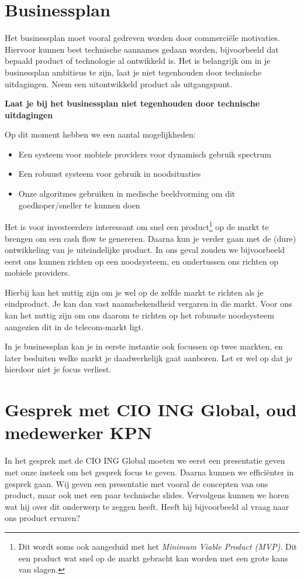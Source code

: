 \documentclass[12pt, a4paper]{article}
\date{\displaydate{date}}
\newenvironment{important}[1][]{%
   \begin{mdframed}[%
      backgroundcolor={red!15}, hidealllines=true,
      skipabove=0.7\baselineskip, skipbelow=0.7\baselineskip,
      splitbottomskip=2pt, splittopskip=4pt, #1]%
   \makebox[0pt]{%
      \smash{%
         \fontsize{32pt}{32pt}\selectfont%
         \hspace*{-19pt}%
         \raisebox{-2pt}{%
            {\color{red!70!black}\sffamily\bfseries !}%
         }%
      }%
   }%
}{\end{mdframed}}
\newcommand{\excl}[1]{
\begin{important}
  \textbf{#1}
\end{important}
}
\begin{document}
\section{Businessplan}
Het businessplan moet vooral gedreven worden door commerciële motivaties. Hiervoor kunnen best technische aannames gedaan worden, bijvoorbeeld dat bepaald product of technologie al ontwikkeld is. Het is belangrijk om in je businessplan ambitieus te zijn, laat je niet tegenhouden door technische uitdagingen. Neem een uitontwikkeld product als uitgangspunt.
\excl{Laat je bij het businessplan niet tegenhouden door technische uitdagingen}

Op dit moment hebben we een aantal mogelijkheden:
\begin{itemize}
\item Een systeem voor mobiele providers voor dynamisch gebruik spectrum
\item Een robuust systeem voor gebruik in noodsituaties
\item Onze algoritmes gebruiken in medische beeldvorming om dit goedkoper/sneller te kunnen doen
\end{itemize}

Het is voor investeerders interessant om snel een product\footnote{Dit wordt soms ook aangeduid met het \textit{Minimum Viable Product (MVP)}. Dit een product wat snel op de markt gebracht kan worden met een grote kans van slagen.} op de markt te brengen om een cash flow te genereren. Daarna kun je verder gaan met de (dure) ontwikkeling van je uiteindelijke product. In ons geval zouden we bijvoorbeeld eerst ons kunnen richten op een noodsysteem, en ondertussen ons richten op mobiele providers.

Hierbij kan het nuttig zijn om je wel op de zelfde markt te richten als je eindproduct. Je kan dan vast naamsbekendheid vergaren in die markt. Voor ons kan het nuttig zijn om ons daarom te richten op het robuuste noodsysteem aangezien dit in de telecom-markt ligt.

In je businessplan kan je in eerste instantie ook focussen op twee markten, en later besluiten welke markt je daadwerkelijk gaat aanboren. Let er wel op dat je hierdoor niet je focus verliest.

\section{Gesprek met CIO ING Global, oud medewerker KPN}
In het gesprek met de CIO ING Global moeten we eerst een presentatie geven met onze insteek om het gesprek focus te geven. Daarna kunnen we efficiënter in gesprek gaan. Wij geven een presentatie met vooral de concepten van ons product, maar ook met een paar technische slides. Vervolgens kunnen we horen wat hij over dit onderwerp te zeggen heeft. Heeft hij bijvoorbeeld al vraag naar ons product ervaren?
\end{document}
